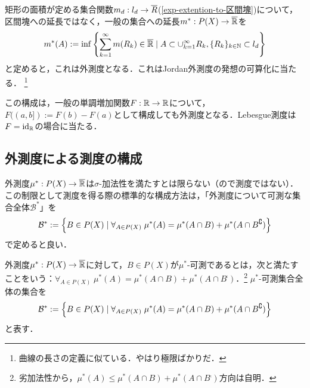 \documentclass[uplatex, dvipdfmx]{jsreport}
\renewcommand{\B}{\mathcal{B}}
\begin{document}
\begin{example}\label{exp-Lebesgue-outer-measure}
    矩形の面積が定める集合関数$m_d:l_d\to\overline{R}$(\ref{exp-extention-to-区間塊})について，区間塊への延長ではなく，一般の集合への延長$m^*:P(X)\to\overline{\mathbb{R}}$を
    \[m^*(A):=\inf\left\{\sum_{k=1}^\infty m(R_k)\in\overline{\mathbb{R}}\mid A\subset\cup^\infty_{k=1}R_k,\{R_k\}_{k\in\mathbb{N}}\subset l_d\right\}\]
    と定めると，これは外測度となる．これはJordan外測度の発想の可算化に当たる．
    \footnote{曲線の長さの定義に似ている．やはり極限ばかりだ．}
\end{example}
\begin{example}\label{exp-Lebesgue-Stieltjes-outer-measure}
    この構成は，一般の単調増加関数$F:\mathbb{R}\to\mathbb{R}$について，$F((a,b]):=F(b)-F(a)$として構成しても外測度となる．Lebesgue測度は$F=\mathrm{id}_{\mathbb{R}}$の場合に当たる．
\end{example}

\subsection{外測度による測度の構成}

\begin{tcolorbox}[colframe=ForestGreen, colback=ForestGreen!10!white,breakable,colbacktitle=ForestGreen!40!white,coltitle=black,fonttitle=\bfseries\sffamily,
title=]
    外測度$\mu^*:P(X)\to\overline{\mathbb{R}}$は$\sigma$-加法性を満たすとは限らない（ので測度ではない）．
    この制限として測度を得る際の標準的な構成方法は，「外測度について可測な集合全体$\B^*$」を
    \[\B^*:=\Brace{B\in P(X)\mid \forall_{A\in P(X)}\;\mu^*(A)=\mu^*(A\cap B)+\mu^*(A\cap B^\comp)}\]
    で定めると良い．
\end{tcolorbox}

\begin{definition}
    外測度$\mu^*:P(X)\to\overline{\mathbb{R}}$に対して，$B\in P(X)$が$\mu^*$-可測であるとは，次と満たすことをいう：$\forall_{A\in P(X)}\;\mu^*(A)=\mu^*(A\cap B)+\mu^*(A\cap B^\comp)$．\footnote{劣加法性から，$\mu^*(A)\le\mu^*(A\cap B)+\mu^*(A\cap B^\comp)$方向は自明．}
    $\mu^*$-可測集合全体の集合を\[\B^*:=\Brace{B\in P(X)\mid \forall_{A\in P(X)}\;\mu^*(A)=\mu^*(A\cap B)+\mu^*(A\cap B^\comp)}\]と表す．
\end{definition}
\end{document}
